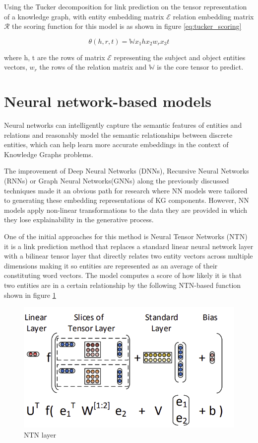 Using the Tucker decomposition for link prediction on the tensor representation of a knowledge graph, with entity embedding matrix $\mathcal{E}$ relation embedding matrix $\mathcal{R}$ the scoring function for this model is as shown in figure \ref{eq:tucker_scoring}

\begin{equation}
    \label{eq:tucker_scoring}
    \theta (h, r, t) = \mathbb{W} x_1 h x_2 w_r x_3 t
\end{equation}

where h, t are the rows of matrix $\mathcal{E}$ representing the subject and object entities vectors, $w_r$ the rows of the relation matrix and $\mathbb{W}$ is the core tensor to predict.

\section{Neural network-based models}\label{sec:emb-nn}

Neural networks can intelligently capture the semantic features of entities and relations and reasonably model the semantic relationships between discrete entities, which can help learn more accurate embeddings in the context of Knowledge Graphs problems. 

The improvement of Deep Neural Networks (DNNs), Recursive Neural Networks (RNNs) or Graph Neural Networks(GNNs) along the previously discussed techniques made it an obvious path for research where NN models were tailored to generating these embedding representations of KG components. However, NN models apply non-linear transformations to the data they are provided in which they lose explainability in the generative process.

One of the initial approaches for this method is Neural Tensor Networks (NTN) \cite{} it is a link prediction method that replaces a standard linear neural network layer with a bilinear tensor layer that directly relates two entity vectors across multiple dimensions making it so entities are represented as an average of their constituting word vectors. The model computes a score of how likely it is that two entities are in a certain relationship by the following NTN-based function shown in figure \ref{fig:emb-ntn}

\begin{figure}[!ht]
    \centering
    \includegraphics[width=.65\textwidth]{fig/embeddings/NTN.png}
    \caption{NTN layer}
    \label{fig:emb-ntn}
\end{figure}

